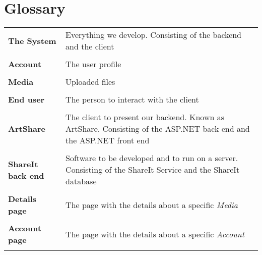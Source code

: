 \documentclass[../report.tex]{subfiles}
\begin{document}
\section{Glossary}
\begin{tabular}{l p{10 cm}}
\textbf{The System} & Everything we develop. Consisting of the backend and the client \\ \\
\textbf{Account} & The user profile \\ \\
\textbf{Media} & Uploaded files \\ \\
\textbf{End user} & The person to interact with the client \\ \\
\textbf{ArtShare} & The client to present our backend. Known as ArtShare. Consisting of the ASP.NET back end and the ASP.NET front end \\ \\
\textbf{ShareIt back end} & Software to be developed and to run on a server. Consisting of the ShareIt Service and the ShareIt database \\ \\
\textbf{Details page} & The page with the details about a specific \textit{Media} \\ \\
\textbf{Account page} & The page with the details about a specific \textit{Account} \\ \\
\end{tabular}
\end{document}
